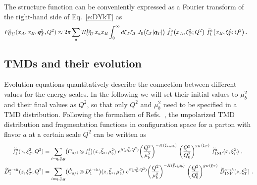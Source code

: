 \documentclass[aps,preprintnumbers,showpacs,nofootinbib,superscriptaddress,floatfix]{revtex4}
\newcommand{\bT}{\xi_T}
\newcommand{\bb}{\xi}
\begin{document}
The structure function can be conveniently expressed as a Fourier transform of
the right-hand side of Eq.~\eqref{e:DYkT} as 
\begin{align}
\label{e:DYkTFF}
   F_{UU}^1(x_A,x_B, \bm{q}_T^2, Q^2) &\approx
 2\pi \sum_a {\cal H}_{UU}^{1 a} \,x_a x_B \int_0^{\infty} d \bT \bT\, J_0\big( \bT |\bm{q}_T|\big)\ 
      \tilde{f}_1^a\big(x_A, \bT^2;Q^2\big) \   \tilde{f}_1^{\bar{a}}\big(x_B, \bT^2;Q^2 \big)  \, .
\end{align} 



\subsection{TMDs and their evolution}
\label{ss:TMDevo}

Evolution equations quantitatively describe the connection between different values for the energy scales. 
In the following we will set their initial values to $\mu_b^2$ and their final values as $Q^2$, so that only $Q^2$ and $\mu_b^2$ need to be specified in a TMD distribution.
Following the formalism of Refs.~\cite{Collins:2011zzd,Aybat:2011zv}, the
unpolarized TMD distribution and fragmentation functions in configuration
space for a parton with flavor $a$ at a certain scale $Q^2$ can be written as 
\begin{align}   
\widetilde{f}_1^a (x,  \bT^2; Q^2) &= \sum_{i=q,\bar q,g} \bigl( C_{a/i} \otimes f_1^i \bigr) (x,\bar{\bb}_\ast,\mu_b^2) 
\  e^{S (\mu_b^2, Q^2)} \bigg(
\frac{Q^2}{\mu_b^2}\bigg)^{-K(\bar{\bb}_\ast;\mu_b)}
\  
\bigg(\frac{Q^2}{Q_0^2} \bigg)^{g_K(\bT)} \  \widetilde{f}_{1 {\rm NP}}^a (x, \bT^2) \ ,
\label{e:TMDevol1} \\
\widetilde{D}_1^{a\to h} (z, \bT^2; Q^2) &= \sum_{i=q,\bar q,g} \bigl(
\hat{C}_{a/i} \otimes D_1^{i\to h} \bigr) (z,\bar{\bb}_\ast, \mu_b^2) \  e^{S
  (\mu_b^2, Q^2)} \bigg(\frac{Q^2}{\mu_b^2}\bigg)^{-K(\bar{\bb}_\ast;\mu_b)}
\  
\bigg(\frac{Q^2}{Q_0^2} \bigg)^{g_K( \bT)} \  \widetilde{D}_{1 {\rm NP}}^{a\to h} (z, \bT^2) \  .
\label{e:TMDevol2}
\end{align}
\end{document}

